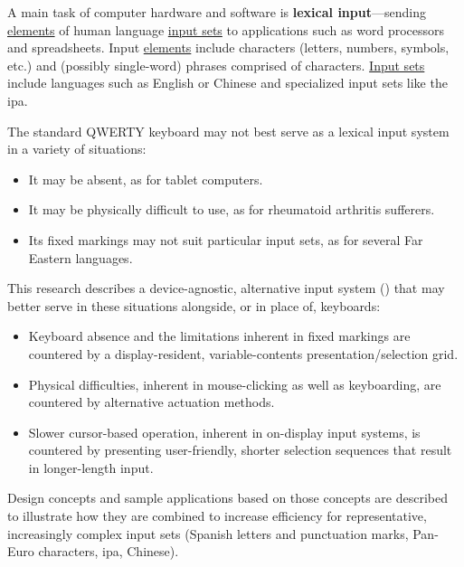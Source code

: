 
A main task of computer hardware and software is \textbf{lexical input}---sending
\underline{elements} of human language \underline{input sets} to applications such as word processors
and spreadsheets. Input \underline{elements} include characters (letters, numbers, symbols, etc.) and
(possibly single-word) phrases comprised of characters. \underline{Input sets} include languages such as
English or Chinese and specialized input sets like the \gls{ipa}.

The standard QWERTY keyboard may not best serve as a lexical input system in a variety of situations:

\begin{itemize}
	\item It may be absent, as for tablet computers.
	\item It may be physically difficult to use, as for rheumatoid arthritis sufferers.
	\item Its fixed markings may not suit particular input sets, as for several Far Eastern languages.
\end{itemize}

This research describes a device-agnostic, alternative input system (\mulexTM) that may better serve in these
situations alongside, or in place of, keyboards:

\begin{itemize}
	\item Keyboard absence and the limitations inherent in fixed markings are countered by a display-resident,
	variable-contents presentation/selection grid.
	\item Physical difficulties, inherent in mouse-clicking as well as keyboarding, are countered by alternative
	actuation methods.
	\item Slower cursor-based operation, inherent in on-display input systems, is countered by presenting
	user-friendly, shorter selection sequences that result in longer-length input.
\end{itemize}

Design concepts and sample applications based on those concepts are described to illustrate how they are combined
to increase efficiency for representative, increasingly complex input sets (Spanish letters and punctuation
marks, Pan-Euro characters, \gls{ipa}, Chinese).

